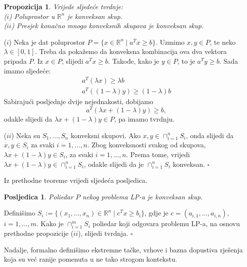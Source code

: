 \documentclass[a4paper, utf8, 11pt, colorlinks]{book}
\newtheorem{prop}{Propozicija}
\newtheorem{poslje}{Posljedica}
\newenvironment{proof}{{Dokaz:}}{\hfill$\square$}
\begin{document}
\begin{prop} Vrijede sljedeće tvrdnje: \\
  ($i$)  Poluprostor u $\mathbb{R}^n$ je konveksan skup.  \\
  ($ii$) Presjek konačno mnogo konveksnih skupova je konveksan skup. 
\end{prop}

\begin{proof}
  ($i$) Neka je dat poluprostor $P = \{ x \in \mathbb{R}^n \mid a^T x \geq b \}$. Uzmimo $x, y \in P$, te neko $\lambda \in [0, 1]$. Treba da pokažemo da konveksna kombinacija ova dva vektora   pripada $P$. Iz $x \in P$, slijedi  $a^T x \geq b$. Takođe, kako je $y \in P$, to je  $a^T y \geq b$. 
  Sada  imamo sljedeće:
  \begin{align}
      a^T (\lambda x) \geq \lambda b \\
      a^T ((1-\lambda) y) \geq (1-\lambda) b 
  \end{align}
  Sabirajući posljednje dvije nejednakosti, dobijamo 
  \begin{equation}
      a^T( \lambda x + (1 - \lambda) y ) \geq b,
  \end{equation}
  odakle slijedi da $\lambda x + (1-\lambda) y \in P$, pa imamo tvrdnju. 
  
  ($ii$) Neka su $S_1,\ldots, S_n$ konveksni skupovi. Ako $x,y \in \cap_{i=1}^n S_i$, onda slijedi da $x,y \in S_i$ za svaki $i=1,\ldots,n$. Zbog konveksnosti svakog od skupova,  
  $\lambda x + (1 - \lambda) y \in S_i$, za svaki $i=1,\ldots,n$. Prema tome, vrijedi $ \lambda x + (1-\lambda) y \in \cap_{i=1}^n S_i$, odakle slijedi da je $\cap_{i=1}^n S_i$ konveksan. 
\end{proof}

Iz prethodne teoreme vrijedi sljedeća posljedica.

\begin{poslje}
Poliedar $P$ nekog problema LP-a je konveksan skup.	
\end{poslje}
 
\begin{proof}
  Definišimo $S_i:= \{ (x_1,\ldots, x_n) \in \mathbb{R}^n \mid c^T x \geq b_i \}$, gdje je  $c = (a_{i,1}, \ldots, a_{i, n}),$  $ i=1,\ldots, m$. Kako je $\cap_{i=1}^m S_i$ poliedar koji odgovara problemu LP-a, na osnovu prethodne propozicije ($ii$), slijedi tvrdnja. 
\end{proof}



Nadalje, formalno definišimo ekstremne tačke, vrhove i bazna dopustiva rješenja koja su već ranije pomenuta u ne tako strogom kontekstu. 
\end{document}
